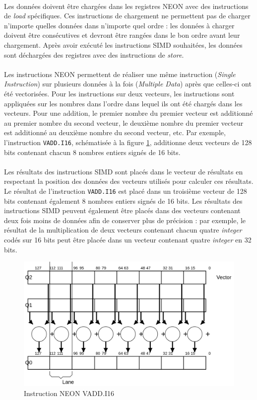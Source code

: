 \documentclass{article}
\begin{document}
    \paragraph{}
    Les données doivent être chargées dans les registres NEON avec des instructions de \emph{load} spécifiques. Ces instructions de chargement ne permettent pas de charger n'importe quelles données dans n'importe quel ordre : les données à charger doivent être consécutives et devront être rangées dans le bon ordre avant leur chargement. Après avoir exécuté les instructions SIMD souhaitées, les données sont déchargées des registres avec des instructions de \emph{store}.

    \paragraph{}
    Les instructions NEON permettent de réaliser une même instruction (\emph{Single Instruction}) sur plusieurs données à la fois (\emph{Multiple Data}) après que celles-ci ont été vectorisées. Pour les instructions sur deux vecteurs, les instructions sont appliquées sur les nombres dans l'ordre dans lequel ils ont été chargés dans les vecteurs. Pour une addition, le premier nombre du premier vecteur est additionné au premier nombre du second vecteur, le deuxième nombre du premier vecteur est additionné au deuxième nombre du second vecteur, etc. Par exemple, l'instruction \texttt{VADD.I16}, schématisée à la figure \ref{fig:neon-example}, additionne deux vecteurs de 128 bits contenant chacun 8 nombres entiers signés de 16 bits.

    \paragraph{}
    Les résultats des instructions SIMD sont placés dans le vecteur de résultats en respectant la position des données des vecteurs utilisés pour calculer ces résultats. Le résultat de l'instruction \texttt{VADD.I16} est placé dans un troisième vecteur de 128 bits contenant également 8 nombres entiers signés de 16 bits. Les résultats des instructions SIMD peuvent également être placés dans des vecteurs contenant deux fois moins de données afin de conserver plus de précision : par exemple, le résultat de la multiplication de deux vecteurs contenant chacun quatre \emph{integer} codés sur 16 bits peut être placée dans un vecteur contenant quatre \emph{integer} en 32 bits.

    \begin{figure}[H]
        \centering
        \includegraphics[width=.6\linewidth]{./images/vadd-i16.png}
        \caption{Instruction NEON VADD.I16}
        \label{fig:neon-example}
    \end{figure}
\end{document}
